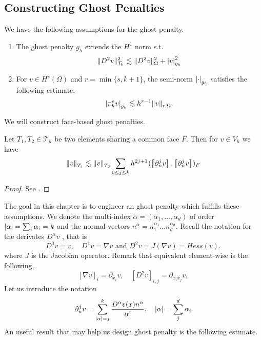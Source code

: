 
\newpage
\subsection{Constructing Ghost Penalties}%
\label{sec:constructing_ghost_penalties}

We have the following assumptions for the ghost penalty.
\begin{enumerate}[label=\textbf{EP\arabic*}]
    \item \label{as:EP1} The ghost penalty $g_{h}$ extends the $H^{1}$ norm s.t. \[
    \| D^2v \|_{ \mathcal{T} _{h} }^{ 2 }  \lesssim \| D^2 v \|_{ \Omega  }^{  2} + \left\lvert  v  \right\rvert _{g_{h}}^2
    \]
\item \label{as:EP2} For $v \in H^{s}( \Omega ) $ and $r = \min \{s,k+1 \} $, the semi-norm $\left\lvert  \cdot   \right\rvert_{g_{h}} $ satisfies the following estimate, \[
    \left\lvert  \pi _{h}^{e} v  \right\rvert _{g_{h}} \lesssim  h^{r-1} \| v \|_{ r,\Omega  }^{  }.
    \]
\end{enumerate}


We will construct face-based ghost penalties.

\begin{lemma}
    Let $T_{1},T_{2 } \in  \mathcal{T} _{h}$ be two elements sharing a common face $F$. Then for $v \in V_{h}$  we have \[
    \| v \|_{ T_{1} }^{  }  \lesssim \| v \|_{ T_{2} }^{  } \sum_{0\le j\le k}  {h^{2j +1}}^{} ( \jump{ \partial _{n}^{j} v }, \jump{ \partial ^{j}_{n} v }    )_{F}
    \]

\end{lemma}
\begin{proof}
    See \cite[Lemma 2.19]{gurkan2019stabilized}.
\end{proof}
The goal in this chapter is to engineer an ghost penalty which fulfills these assumptions.
We denote the multi-index $\alpha  = ( \alpha _{1}, \ldots, \alpha _{d})  $ of order $\left\lvert  \alpha   \right\rvert = \sum_{i}^{}  \alpha _{i} = k $   and the normal vectors $n^{\alpha } = n_{1}^{\alpha _{1}} \ldots n_{d}^{\alpha _{d}}$.
Recall the notation for the derivates $D^{\alpha } v$ , that is \[
D ^{0} v  = v, \quad   D ^{1}v  = \nabla v \text{ and }  D ^{2} v  = J(\nabla v) = Hess(v).
\]
where $J$ is the Jacobian operator. Remark that equivalent element-wise is the following, \[
\left[ \nabla v \right] _{i} = \partial_{x_{i}} v, \quad  \left[ D^2 v \right] _{i,j} = \partial_{x_{i}x_{j}} v,
\]
Let us introduce the notation \[
\partial _{n}^{j} v = \sum_{\left\lvert  \alpha   \right\rvert =j }^{k} \frac{D ^{\alpha }v( x) n^{\alpha }}{\alpha !}, \quad \left\lvert  \alpha   \right\rvert = \sum_{j}^{d} \alpha_{i}
\]
An useful result that may help us design ghost penalty is the following estimate.

